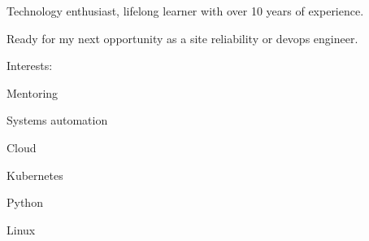 

\begin{cvparagraph}

Technology enthusiast, lifelong learner with over 10 years of experience.

Ready for my next opportunity as a site reliability or devops engineer.

Interests:
\hfill \break

\begin{cvitems} %
    \item {Mentoring}
    \item {Systems automation}
    \item {Cloud}
    \item {Kubernetes}
    \item {Python}
    \item {Linux}
\end{cvitems}

\end{cvparagraph}

